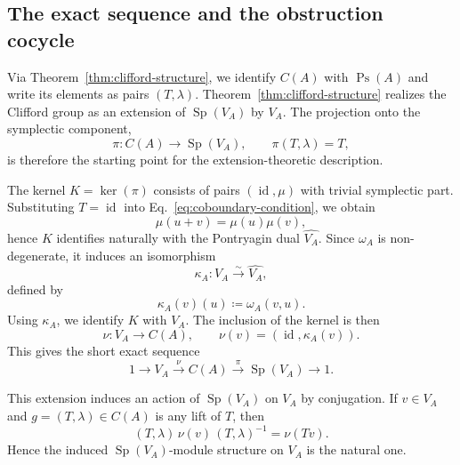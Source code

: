 \documentclass[11pt, reqno]{amsart}
\theoremstyle{definition}
\theoremstyle{remark}
\DeclareMathOperator{\Sp}{Sp}
\DeclareMathOperator{\Ps}{Ps}
\DeclareMathOperator{\id}{id}
\begin{document}
\subsection{The exact sequence and the obstruction cocycle}

Via Theorem~\ref{thm:clifford-structure}, we identify $C(A)$ with $\Ps(A)$ and write its elements as pairs $(T,\lambda)$. Theorem~\ref{thm:clifford-structure} realizes the Clifford group as an extension of $\Sp(V_A)$ by $V_A$. The projection onto the symplectic component,
\[
\pi: C(A) \to \Sp(V_A), \qquad \pi(T,\lambda)=T,
\]
is therefore the starting point for the extension-theoretic description.

The kernel $K=\ker(\pi)$ consists of pairs $(\id,\mu)$ with trivial symplectic part. Substituting $T=\id$ into Eq.~\eqref{eq:coboundary-condition}, we obtain
\[
\mu(u+v)=\mu(u)\mu(v),
\]
hence $K$ identifies naturally with the Pontryagin dual $\widehat{V_A}$. Since $\omega_A$ is non-degenerate, it induces an isomorphism
\[
\kappa_A: V_A \xrightarrow{\sim} \widehat{V_A},
\]
defined by
\begin{equation}
\kappa_A(v)(u) \coloneqq \omega_A(v, u).
\end{equation}
Using $\kappa_A$, we identify $K$ with $V_A$. The inclusion of the kernel is then
\[
\nu: V_A \to C(A), \qquad \nu(v)=(\id,\kappa_A(v)).
\]
This gives the short exact sequence
\begin{equation}\label{eq:clifford-ses-final}
1 \longrightarrow V_A \xrightarrow{\;\nu\;} C(A) \xrightarrow{\;\pi\;} \Sp(V_A) \longrightarrow 1.
\end{equation}

This extension induces an action of $\Sp(V_A)$ on $V_A$ by conjugation. If $v \in V_A$ and $g=(T,\lambda)\in C(A)$ is any lift of $T$, then
\begin{equation}
(T,\lambda)\,\nu(v)\,(T,\lambda)^{-1}=\nu(Tv).
\end{equation}
Hence the induced $\Sp(V_A)$-module structure on $V_A$ is the natural one.
\end{document}
